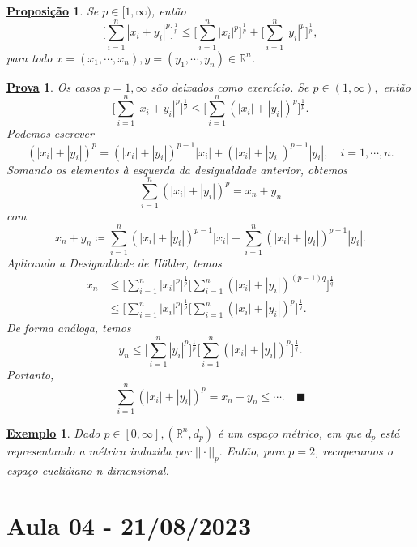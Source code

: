\documentclass{article}
\newtheorem*{prop*}{\underline{Proposi\c c\~ao}}
\newtheorem{example}{\underline{Exemplo}}
\newtheorem*{proof*}{\underline{Prova}}
\renewcommand\qedsymbol{$\blacksquare$}
\begin{document}
\begin{prop*}
  Se \(p\in[1, \infty)\), então 
    \[
      \biggl[\sum\limits_{i=1}^{n}|x_{i}+y_{i}|^{p}\biggr]^{\frac{1}{p}}\leq \biggl[\sum\limits_{i=1}^{n}|x_{i}|^{p}\biggr]^{\frac{1}{p}} + \biggl[\sum\limits_{i=1}^{n}|y_{i}|^{p}\biggr]^{\frac{1}{p}},
    \]
  para todo \(x=(x_{1}, \cdots, x_{n}), y=(y_{1}, \cdots, y_{n})\in \mathbb{R}^{n}\).
\end{prop*}
\begin{proof*}
  Os casos \(p=1, \infty\) são deixados como exercício. Se \(p\in(1, \infty),\) então 
    \[
      \biggl[\sum\limits_{i=1}^{n}|x_{i}+y_{i}|^{p}\biggr]^{\frac{1}{p}}\leq \biggl[\sum\limits_{i=1}^{n}(|x_{i}|+|y_{i}|)^{p}\biggr]^{\frac{1}{p}}.
    \]
  Podemos escrever 
    \[
      (|x_{i}|+|y_{i}|)^{p} = (|x_{i}|+|y_{i}|)^{p-1}|x_{i}|+(|x_{i}|+|y_{i}|)^{p-1}|y_{i}|,\quad i = 1, \cdots, n.
    \]
    Somando os elementos à esquerda da desigualdade anterior, obtemos 
      \[
        \sum\limits_{i=1}^{n}(|x_{i}|+|y_{i}|)^{p} = x_{n}+y_{n}
      \]
    com 
      \[
        x_{n} + y_{n}\coloneqq \sum\limits_{i=1}^{n}(|x_{i}|+|y_{i}|)^{p-1}|x_{i}| + \sum\limits_{i=1}^{n}(|x_{i}|+|y_{i}|)^{p-1}|y_{i}|.
      \]
    Aplicando a Desigualdade de Hölder, temos 
   \begin{align*}
     x_{n}&\leq \biggl[\sum\limits_{i=1}^{n}|x_{i}|^{p}\biggr]^{\frac{1}{p}}\biggl[\sum\limits_{i=1}^{n}(|x_{i}|+|y_{i}|)^{(p-1)q}\biggr]^{\frac{1}{q}}\\
          &\leq \biggl[\sum\limits_{i=1}^{n}|x_{i}|^{p}\biggr]^{\frac{1}{p}}\biggl[\sum\limits_{i=1}^{n}(|x_{i}|+|y_{i}|)^{p}\biggr]^{\frac{1}{q}}.
   \end{align*}
   De forma análoga, temos 
     \[
       y_{n}\leq \biggl[\sum\limits_{i=1}^{n}|y_{i}|^{p}\biggr]^{\frac{1}{p}}\biggl[\sum\limits_{i=1}^{n}(|x_{i}|+|y_{i}|)^{p}\biggr]^{\frac{1}{q}}.
     \]
  Portanto, 
    \[
      \sum\limits_{i=1}^{n}(|x_{i}|+|y_{i}|)^{p} = x_{n} + y_{n}\leq \cdots.\quad\text{\qedsymbol}
    \]
\end{proof*}
\begin{example}
  Dado \(p\in[0, \infty], (\mathbb{R}^{n}, d_{p})\) é um espaço métrico, em que \(d_{p}\) está representando a métrica induzida por \(||\cdot ||_{p}.\) Então, para \(p=2\),
recuperamos o espaço euclidiano n-dimensional.
\end{example}
\newpage

\section{Aula 04 - 21/08/2023}
\end{document}
